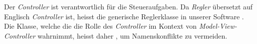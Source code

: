 Der   \emph{Controller}  ist   verantwortlich  f\"ur   die  Steueraufgaben. Da
\emph{Regler}   \"ubersetzt  auf   Englisch   \emph{Controller}  ist,   heisst
die  generische   Reglerklasse  in  unserer   Software  . Die
Klasse,  welche   die  die   Rolle  des   \emph{Controller}  im   Kontext  von
\emph{Model-View-Controller} wahrnimmt, heisst  daher , um
Namenskonflikte zu vermeiden.
